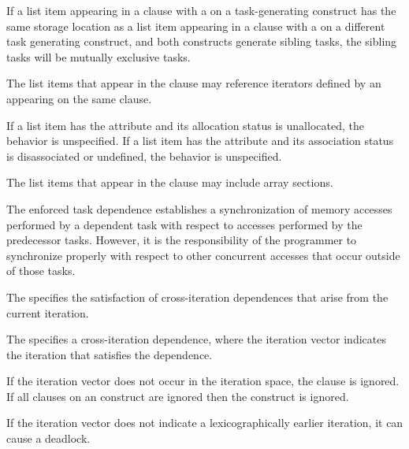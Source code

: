 If a list item appearing in a  clause with a 
 on a task-generating construct has the same storage location as
a list item appearing in a  clause with a 
 on a different task generating construct, and both constructs
generate sibling tasks, the sibling tasks will be mutually exclusive tasks.

The list items that appear in the  clause may reference iterators
defined by an  appearing on the same clause.

\begin{fortranspecific}
If a list item has the  attribute and its allocation
status is unallocated, the behavior is unspecified. If a list item has
the  attribute and its association status is
disassociated or undefined, the behavior is unspecified.
\end{fortranspecific}

The list items that appear in the  clause may include array sections.

\begin{note}
The enforced task dependence establishes a synchronization of memory
accesses performed by a dependent task with respect to accesses performed by the
predecessor tasks. However, it is the responsibility of the programmer to synchronize properly with respect to other concurrent accesses that occur outside of those tasks.
\end{note}

The   specifies the satisfaction of
cross-iteration dependences that arise from the current iteration.

The   specifies a cross-iteration dependence,
where the iteration vector  indicates the iteration that satisfies
the dependence.

If the iteration vector  does not occur in the iteration space,
the  clause is ignored.  If all  clauses on an
 construct are ignored then the construct is ignored.

\begin{note}
If the iteration vector  does not indicate a lexicographically earlier iteration, it can cause a deadlock.
\end{note}

\events

